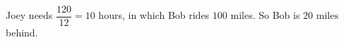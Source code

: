 Joey needs $\dfrac{120}{12}=10$ hours, in which Bob rides $100$ miles. So Bob is $\boxed{20\text{ miles}}$ behind.
